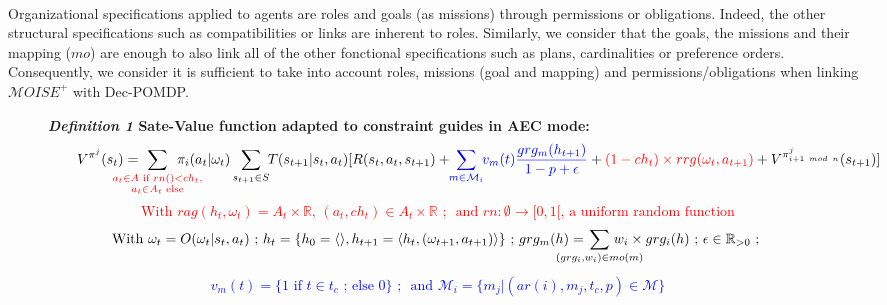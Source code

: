 \documentclass[sigconf,anonymous]{aamas}
\begin{document}
\

\noindent Organizational specifications applied to agents are roles and goals (as missions) through permissions or obligations. Indeed, the other structural specifications such as compatibilities or links are inherent to roles. Similarly, we consider that the goals, the missions and their mapping ($mo$) are enough to also link all of the other fonctional specifications such as plans, cardinalities or preference orders.
Consequently, we consider it is sufficient to take into account roles, missions (goal and mapping) and permissions/obligations when linking $\mathcal{M}OISE^+$ with Dec-POMDP. 

\begin{figure*}[t]
    \label{eq:single_value_function}
    \raggedright
    \textbf{\textit{Definition 1} \quad Sate-Value function adapted to constraint guides in AEC mode:}
    \begin{gather*}
      \text{\quad \quad} V^{\pi^j}(s_t) = \hspace{-0.75cm} \sum_{\textcolor{red}{ \substack{a_{t} \in A \text{ if } rn() < ch_{t}, \\ 
      a_{t} \in A_{t} \text{ else}}
      }}{\hspace{-0.7cm} \pi_i(a_{t} | \omega_t)} \sum_{s_{t+1} \in S}{\hspace{-0.1cm} T(s_{t+1} | s_t, a_{t})[R(s_t,a_{t},s_{t+1}) + \hspace{-0.1cm} \textcolor{blue}{ \sum_{m \in \mathcal{M}_i}{ \hspace{-0.1cm} v_m(t) \frac{grg_m(h_{t+1})}{1 - p + \epsilon} } } + \textcolor{red}{(1-ch_t) \times rrg(\omega_t,a_{t+1})} + V^{\pi^j_{i+1 \ mod \ n}}(s_{t+1})]}
    \end{gather*}  
    \textcolor{red}{\[\text{With } rag(h_t, \omega_t) = A_{t} \times \mathbb{R} \text{, } (a_t, ch_{t}) \in A_{t} \times \mathbb{R} \text{ ; } \text{ and } rn: \emptyset \to [0,1[ \text{, a uniform random function}\]}
    \vspace{-0.5cm}
    \textcolor{blue}{
    \begin{gather*}
    \text{With } \omega_t = O(\omega_t | s_t, a_t) \text{ ; } h_t = \{h_0 = \langle \rangle, h_{t+1} = \langle h_t, (\omega_{t+1}, a_{t+1}) \rangle \} \text{ ; } grg_m(h) = \hspace{-0.8cm} \sum_{(grg_i,w_i) \in mo(m)}{\hspace{-0.8cm} w_i \times grg_i(h)} \text{ ; } \epsilon \in \mathbb{R}_{>0} \text{ ; }
    \end{gather*}
    }
    \vspace{-0.75cm}
    \textcolor{blue}{
    \begin{gather*}
    v_m(t) = \{ 1 \text{ if } t \in t_c \text{ ; else } 0 \} \text{ ; } \text{ and } \mathcal{M}_i = \{m_j | (ar(i),m_j,t_c,p) \in \mathcal{M}\}
    \end{gather*}
    }
    \vspace{-0.6cm}
\end{figure*}
\end{document}
